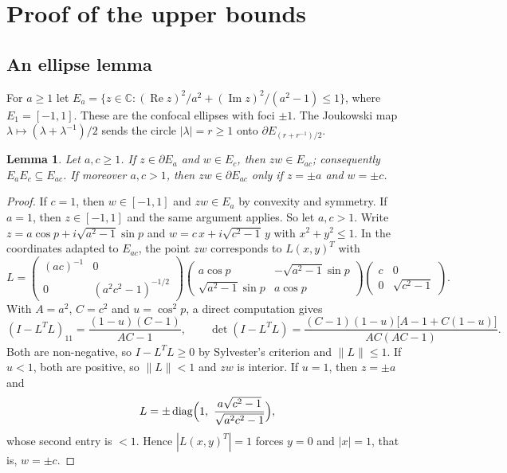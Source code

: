 \documentclass[11pt]{amsart}
\newtheorem{lemma}[theorem]{Lemma}
\theoremstyle{definition}
\theoremstyle{remark}
\newcommand{\C}{\mathbb{C}}
\newcommand{\re}{\operatorname{Re}}
\newcommand{\im}{\operatorname{Im}}
\begin{document}
\section{Proof of the upper bounds}\label{sec:upper}

\subsection{An ellipse lemma}
For $a\ge1$ let
$E_a=\{z\in\C:(\re z)^2/a^2+(\im z)^2/(a^2-1)\le1\}$, where $E_1=[-1,1]$.
These are the confocal ellipses with foci $\pm1$.  The Joukowski map
$\lambda\mapsto(\lambda+\lambda^{-1})/2$ sends the circle $|\lambda|=r\ge1$
onto $\partial E_{(r+r^{-1})/2}$.

\begin{lemma}\label{lem:ellipse}
Let $a,c\ge1$.  If $z\in\partial E_a$ and $w\in E_c$, then $zw\in E_{ac}$;
consequently $E_aE_c\subseteq E_{ac}$.  If moreover $a,c>1$, then
$zw\in\partial E_{ac}$ only if $z=\pm a$ and $w=\pm c$.
\end{lemma}

\begin{proof}
If $c=1$, then $w\in[-1,1]$ and $zw\in E_a$ by convexity and symmetry.  If
$a=1$, then $z\in[-1,1]$ and the same argument applies.  So let $a,c>1$.
Write
$z=a\cos p+i\sqrt{a^2-1}\sin p$ and $w=c\,x+i\sqrt{c^2-1}\,y$ with
$x^2+y^2\le1$.  In the coordinates adapted to $E_{ac}$, the point $zw$
corresponds to $L(x,y)^T$ with
\[
L=\begin{pmatrix}(ac)^{-1}&0\\0&(a^2c^2-1)^{-1/2}\end{pmatrix}
\begin{pmatrix}a\cos p&-\sqrt{a^2-1}\sin p\\ \sqrt{a^2-1}\sin p&a\cos p\end{pmatrix}
\begin{pmatrix}c&0\\0&\sqrt{c^2-1}\end{pmatrix}.
\]
With $A=a^2$, $C=c^2$ and $u=\cos^2p$, a direct computation gives
\[
(I-L^TL)_{11}=\frac{(1-u)(C-1)}{AC-1},\qquad
\det(I-L^TL)=\frac{(C-1)(1-u)\bigl[A-1+C(1-u)\bigr]}{AC(AC-1)} .
\]
Both are non-negative, so $I-L^TL\ge0$ by Sylvester's criterion and
$\|L\|\le1$.  If $u<1$, both are positive, so $\|L\|<1$ and $zw$ is
interior.  If $u=1$, then $z=\pm a$ and
\[
L=\pm\operatorname{diag}\Bigl(1,\ \frac{a\sqrt{c^2-1}}{\sqrt{a^2c^2-1}}\Bigr),
\]
whose second entry is $<1$.  Hence $|L(x,y)^T|=1$ forces $y=0$ and $|x|=1$,
that is, $w=\pm c$.
\end{proof}
\end{document}

